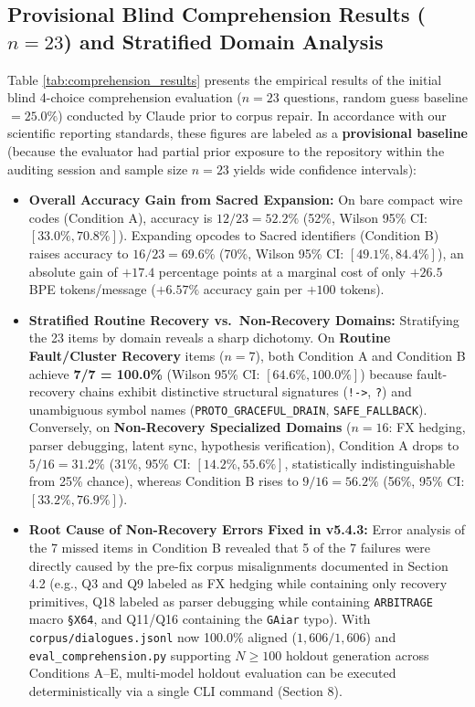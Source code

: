 \documentclass[9pt,a4paper]{extarticle}
\begin{document}
\subsection{Provisional Blind Comprehension Results ($n=23$) and Stratified Domain Analysis}
Table \ref{tab:comprehension_results} presents the empirical results of the initial blind 4-choice comprehension evaluation ($n=23$ questions, random guess baseline $= 25.0\%$) conducted by Claude prior to corpus repair. In accordance with our scientific reporting standards, these figures are labeled as a \textbf{provisional baseline} (because the evaluator had partial prior exposure to the repository within the auditing session and sample size $n=23$ yields wide confidence intervals):
\begin{itemize}
  \item \textbf{Overall Accuracy Gain from Sacred Expansion:} On bare compact wire codes (Condition A), accuracy is $12/23 = \mathbf{52.2\%}$ (52\%, Wilson 95\% CI: $[33.0\%, 70.8\%]$). Expanding opcodes to Sacred identifiers (Condition B) raises accuracy to $16/23 = \mathbf{69.6\%}$ (70\%, Wilson 95\% CI: $[49.1\%, 84.4\%]$), an absolute gain of $+17.4$ percentage points at a marginal cost of only $+26.5$ BPE tokens/message ($+6.57\%$ accuracy gain per $+100$ tokens).
  \item \textbf{Stratified Routine Recovery vs.\ Non-Recovery Domains:} Stratifying the 23 items by domain reveals a sharp dichotomy. On \textbf{Routine Fault/Cluster Recovery} items ($n=7$), both Condition A and Condition B achieve \textbf{7/7 = 100.0\%} (Wilson 95\% CI: $[64.6\%, 100.0\%]$) because fault-recovery chains exhibit distinctive structural signatures (\texttt{!->}, \texttt{?}) and unambiguous symbol names (\texttt{PROTO\_GRACEFUL\_DRAIN}, \texttt{SAFE\_FALLBACK}). Conversely, on \textbf{Non-Recovery Specialized Domains} ($n=16$: FX hedging, parser debugging, latent sync, hypothesis verification), Condition A drops to $5/16 = \mathbf{31.2\%}$ (31\%, 95\% CI: $[14.2\%, 55.6\%]$, statistically indistinguishable from 25\% chance), whereas Condition B rises to $9/16 = \mathbf{56.2\%}$ (56\%, 95\% CI: $[33.2\%, 76.9\%]$).
  \item \textbf{Root Cause of Non-Recovery Errors Fixed in v5.4.3:} Error analysis of the 7 missed items in Condition B revealed that 5 of the 7 failures were directly caused by the pre-fix corpus misalignments documented in Section 4.2 (e.g., Q3 and Q9 labeled as FX hedging while containing only recovery primitives, Q18 labeled as parser debugging while containing \texttt{ARBITRAGE} macro \texttt{\S X64}, and Q11/Q16 containing the \texttt{GAiar} typo). With \texttt{corpus/dialogues.jsonl} now 100.0\% aligned ($1{,}606/1{,}606$) and \texttt{eval\_comprehension.py} supporting $N \ge 100$ holdout generation across Conditions A--E, multi-model holdout evaluation can be executed deterministically via a single CLI command (Section 8).
\end{itemize}
\end{document}
